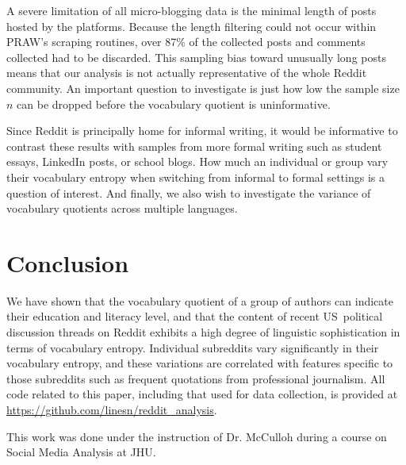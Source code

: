 \documentclass[sigconf]{acmart}
\begin{document}
A severe limitation of all micro-blogging data is the minimal length of
posts hosted by the platforms. Because the length filtering could not occur
within PRAW's scraping routines, over 87\% of the collected posts and
comments collected had to be discarded. This sampling bias toward unusually
long posts means that our analysis is not actually representative of the
whole Reddit community. An important question to investigate is just how low
the sample size $n$ can be dropped before the vocabulary quotient is
uninformative. 

Since Reddit is principally home for informal writing, it would be
informative to contrast these results with samples from more formal writing
such as student essays, LinkedIn posts, or school blogs. How much an
individual or group vary their vocabulary entropy when switching from
informal to formal settings is a question of interest. And finally, we also
wish to investigate the variance of vocabulary quotients across multiple
languages.

\section{Conclusion}

We have shown that the vocabulary quotient of a group of authors can
indicate their education and literacy level, and that the content of recent
US\ political discussion threads on Reddit exhibits a high degree of
linguistic sophistication in terms of vocabulary entropy. Individual
subreddits vary significantly in their vocabulary entropy, and these
variations are correlated with features specific to those subreddits such as
frequent quotations from professional journalism. All code related to this
paper, including that used for data collection, is provided at 
\href{https://github.com/linesn/reddit\_analysis}{https://github.com/linesn/reddit\_analysis}.

\begin{acks}
This work was done under the instruction of Dr. McCulloh during a course on Social Media Analysis at JHU.
\end{acks}




\end{document}
